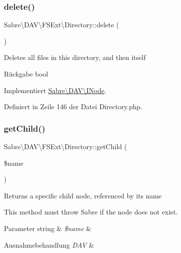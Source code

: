 \subsubsection{\texorpdfstring{delete()}{delete()}}
{\footnotesize\ttfamily Sabre\textbackslash{}\+D\+A\+V\textbackslash{}\+F\+S\+Ext\textbackslash{}\+Directory\+::delete (\begin{DoxyParamCaption}{ }\end{DoxyParamCaption})}

Deletes all files in this directory, and then itself

\begin{DoxyReturn}{Rückgabe}
bool 
\end{DoxyReturn}


Implementiert \mbox{\hyperlink{interface_sabre_1_1_d_a_v_1_1_i_node_a72cd0ee4e36dfced2b0412d14dbd73e6}{Sabre\textbackslash{}\+D\+A\+V\textbackslash{}\+I\+Node}}.



Definiert in Zeile 146 der Datei Directory.\+php.

\mbox{\label{class_sabre_1_1_d_a_v_1_1_f_s_ext_1_1_directory_a48a768e92b00f3d33f567830a7be8932}} 
\subsubsection{\texorpdfstring{get\+Child()}{getChild()}}
{\footnotesize\ttfamily Sabre\textbackslash{}\+D\+A\+V\textbackslash{}\+F\+S\+Ext\textbackslash{}\+Directory\+::get\+Child (\begin{DoxyParamCaption}\item[{}]{\$name }\end{DoxyParamCaption})}

Returns a specific child node, referenced by its name

This method must throw Sabre if the node does not exist.


\begin{DoxyParams}[1]{Parameter}
string & {\em \$name} & \\
\hline
\end{DoxyParams}

\begin{DoxyExceptions}{Ausnahmebehandlung}
{\em D\+AV} & \\
\hline
\end{DoxyExceptions}


